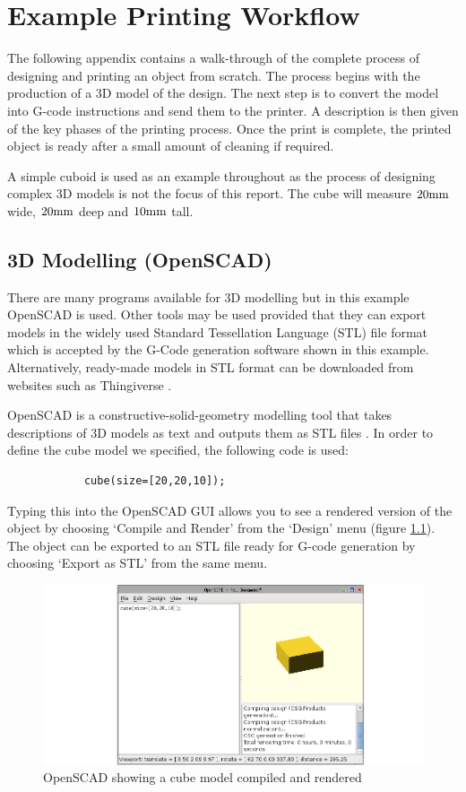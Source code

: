 \chapter{Example Printing Workflow}
	
	\label{sec:workflow}
	
	The following appendix contains a walk-through of the complete process of
	designing and printing an object from scratch. The process begins with the
	production of a 3D model of the design. The next step is to convert the model
	into G-code instructions and send them to the printer. A description is then
	given of the key phases of the printing process. Once the print is complete,
	the printed object is ready after a small amount of cleaning if required.
	
	A simple cuboid is used as an example throughout as the process of designing
	complex 3D models is not the focus of this report. The cube will measure
	$20\textrm{mm}$ wide, $20\textrm{mm}$ deep and $10\textrm{mm}$ tall.
	
	\section{3D Modelling (OpenSCAD)}
		
		There are many programs available for 3D modelling but in this example
		OpenSCAD is used. Other tools may be used provided that they can export
		models in the widely used Standard Tessellation Language (STL) file format
		which is accepted by the G-Code generation software shown in this example.
		Alternatively, ready-made models in STL format can be downloaded from
		websites such as Thingiverse \cite{thingiverse}.
		
		OpenSCAD is a constructive-solid-geometry modelling tool that takes
		descriptions of 3D models as text and outputs them as STL files
		\cite{openscad}. In order to define the cube model we specified, the
		following code is used:
		\begin{verbatim}
			cube(size=[20,20,10]);
		\end{verbatim}
		Typing this into the OpenSCAD GUI allows you to see a rendered version of
		the object by choosing `Compile and Render' from the `Design' menu (figure
		\ref{fig:openSCAD}).  The
		object can be exported to an STL file ready for G-code generation by
		choosing `Export as STL' from the same menu.
		
		\begin{figure}
			\includegraphics[width=1\textwidth]{diagrams/openSCAD.pdf}
			\caption{OpenSCAD showing a cube model compiled and rendered}
			\label{fig:openSCAD}
		\end{figure}
		
